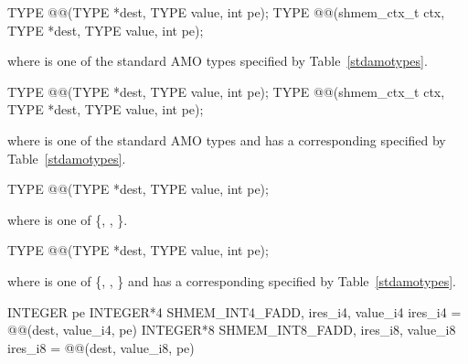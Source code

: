 
\begin{apidefinition}

\begin{C11synopsis}
TYPE @@(TYPE *dest, TYPE value, int pe);
TYPE @@(shmem_ctx_t ctx, TYPE *dest, TYPE value, int pe);
\end{C11synopsis}
where \TYPE{} is one of the standard \ac{AMO} types specified by
Table~\ref{stdamotypes}.

\begin{Csynopsis}
TYPE @@(TYPE *dest, TYPE value, int pe);
TYPE @@(shmem_ctx_t ctx, TYPE *dest, TYPE value, int pe);
\end{Csynopsis}
where \TYPE{} is one of the standard \ac{AMO} types and has a corresponding
\TYPENAME{} specified by Table~\ref{stdamotypes}.

\begin{DeprecateBlock}
\begin{C11synopsis}
TYPE @@(TYPE *dest, TYPE value, int pe);
\end{C11synopsis}
where \TYPE{} is one of \{, , \}.

\begin{Csynopsis}
TYPE @@(TYPE *dest, TYPE value, int pe);
\end{Csynopsis}
where \TYPE{} is one of \{, , \}
and has a corresponding \TYPENAME{} specified by Table~\ref{stdamotypes}.
\end{DeprecateBlock}

\begin{Fsynopsis}
INTEGER pe
INTEGER*4 SHMEM_INT4_FADD, ires_i4, value_i4
ires\_i4 = @@(dest, value_i4, pe)
INTEGER*8 SHMEM_INT8_FADD, ires_i8, value_i8
ires\_i8 = @@(dest, value_i8, pe)
\end{Fsynopsis}

\begin{apiarguments}



\end{apiarguments}
\end{apidefinition}
